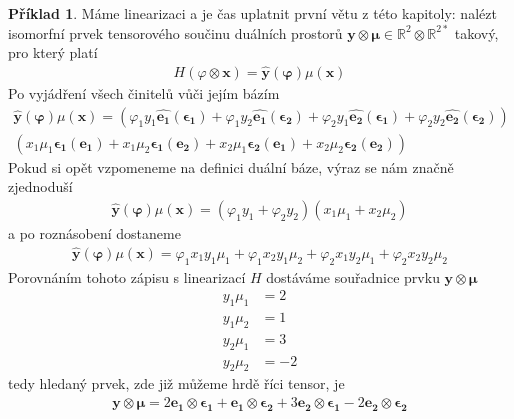 \documentclass[a5paper,12pt]{amsbook}
\theoremstyle{definition}
\newtheorem{example}{Příklad}[chapter]
\newcommand{\myvec}[1]{\bm{#1}}
\newcommand{\myspace}[1]{\mathbb{#1}}
\newcommand{\mycocovec}[1]{\mathbf{\widehat{#1}}}
\begin{document}
\begin{example}
Máme linearizaci a je čas uplatnit první větu z této kapitoly: nalézt isomorfní prvek tensorového
součinu duálních prostorů $\myvec{y}\otimes\myvec{\mu}\in \myspace{R}^2\otimes\myspace{R}^{2*}$
takový, pro který platí
\begin{equation*}
\begin{split}
H(\myspace{\varphi}\otimes\myvec{x}) = \mycocovec{y}(\myvec{\varphi})\myspace{\mu}(\myvec{x})
\end{split}
\end{equation*}
Po vyjádření všech činitelů vůči jejím bázím
\begin{equation*}
\begin{split}
\mycocovec{y}(\myvec{\varphi})\myspace{\mu}(\myvec{x})
  = (\varphi_1 y_1 \mycocovec{e_1}(\myvec{\epsilon_1})
  + \varphi_1 y_2 \mycocovec{e_1}(\myvec{\epsilon_2})
  + \varphi_2 y_1 \mycocovec{e_2}(\myvec{\epsilon_1})
  + \varphi_2 y_2 \mycocovec{e_2}(\myvec{\epsilon_2})) \\
    (x_1 \mu_1 \myvec{\epsilon_1}(\myvec{e_1})
  + x_1 \mu_2 \myvec{\epsilon_1}(\myvec{e_2})
  + x_2 \mu_1 \myvec{\epsilon_2}(\myvec{e_1})
  + x_2 \mu_2 \myvec{\epsilon_2}(\myvec{e_2}))
\end{split}
\end{equation*}
Pokud si opět vzpomeneme na definici duální báze, výraz se nám značně zjednoduší
\begin{equation*}
\begin{split}
\mycocovec{y}(\myvec{\varphi})\myspace{\mu}(\myvec{x})
  = (\varphi_1 y_1 + \varphi_2 y_2)(x_1 \mu_1 + x_2 \mu_2)
\end{split}
\end{equation*}
a po roznásobení dostaneme
\begin{equation*}
\begin{split}
\mycocovec{y}(\myvec{\varphi})\myspace{\mu}(\myvec{x})
= \varphi_1 x_1 y_1 \mu_1 + \varphi_1 x_2 y_1 \mu_2 + \varphi_2 x_1 y_2 \mu_1 + \varphi_2 x_2 y_2 \mu_2
\end{split}
\end{equation*}
Porovnáním tohoto zápisu s linearizací $H$ dostáváme souřadnice prvku $\myvec{y}\otimes\myvec{\mu}$
\begin{equation*}
\begin{split}
y_1 \mu_1 &= 2 \\
y_1 \mu_2 &= 1 \\
y_2 \mu_1 &= 3 \\
y_2 \mu_2 &= -2
\end{split}
\end{equation*}
tedy hledaný prvek, zde již můžeme hrdě říci tensor, je
\begin{equation*}
\begin{split}
\myvec{y}\otimes\myvec{\mu} 
  = 2\myvec{e_1}\otimes\myvec{\epsilon_1}
  + \myvec{e_1}\otimes\myvec{\epsilon_2}
  + 3\myvec{e_2}\otimes\myvec{\epsilon_1}
  - 2\myvec{e_2}\otimes\myvec{\epsilon_2}
\end{split}
\end{equation*}
\end{example}
\end{document}
